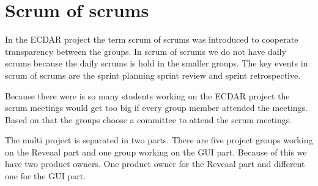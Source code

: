\section{Scrum of scrums}
In the ECDAR project the term scrum of scrums was introduced to cooperate transparency between the groups.
In scrum of scrums we do not have daily scrums because the daily scrums is hold in the smaller groups.
The key events in scrum of scrums are the sprint planning sprint review and sprint retrospective.

Because there were is so many students working on the ECDAR project the scrum meetings would get too big if every group member attended the meetings.
Based on that the groups choose a committee to attend the scrum meetings.

The multi project is separated in two parts. 
There are five project groups working on the Reveaal part and one group working on the GUI part.
Because of this we have two product owners.
One product owner for the Reveaal part and different one for the GUI part.



